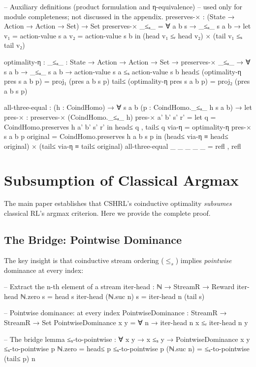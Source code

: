 \documentclass[9pt,a4paper]{article}
\theoremstyle{plain}
\theoremstyle{definition}
\theoremstyle{remark}
\begin{document}
\begin{code}[hide]
  -- Auxiliary definitions (product formulation and η-equivalence)
  -- used only for module completeness; not discussed in the appendix.
  preserves-× : (State → Action → Action → Set) → Set
  preserves-× _≤ₐ_ = ∀ a b s → _≤ₐ_ s a b →
                     let v₁ = action-value s a
                         v₂ = action-value s b
                     in (head v₁ ≤ᵣ head v₂) × (tail v₁ ≤ₛ tail v₂)

  optimality-η : {_≤ₐ_ : State → Action → Action → Set} →
                 preserves-× _≤ₐ_ →
                 ∀ s a b → _≤ₐ_ s a b →
                 action-value s a ≤ₛ action-value s b
  head≤ (optimality-η pres s a b p) = proj₁ (pres a b s p)
  tail≤ (optimality-η pres s a b p) = proj₂ (pres a b s p)

  all-three-equal : (h : CoindHomo) →
                    ∀ s a b (p : CoindHomo._≤ₐ_ h s a b) →
                    let pres-× : preserves-× (CoindHomo._≤ₐ_ h)
                        pres-× a' b' s' r' = let q = CoindHomo.preserves h a' b' s' r'
                                             in head≤ q , tail≤ q
                        via-η = optimality-η pres-× s a b p
                        original = CoindHomo.preserves h a b s p
                    in (head≤ via-η ≡ head≤ original)
                     × (tail≤ via-η ≡ tail≤ original)
  all-three-equal _ _ _ _ _ = refl , refl
\end{code}

\section{Subsumption of Classical Argmax}
\label{sec:subsumption}

The main paper establishes that CSHRL's coinductive optimality \emph{subsumes} classical RL's argmax criterion. Here we provide the complete proof.

\subsection{The Bridge: Pointwise Dominance}

The key insight is that coinductive stream ordering ($\le_s$) implies \emph{pointwise} dominance at every index:

\begin{code}
  -- Extract the n-th element of a stream
  iter-head : ℕ → StreamR → Reward
  iter-head ℕ.zero    s = head s
  iter-head (ℕ.suc n) s = iter-head n (tail s)

  -- Pointwise dominance: at every index
  PointwiseDominance : StreamR → StreamR → Set
  PointwiseDominance x y = ∀ n → iter-head n x ≤ᵣ iter-head n y

  -- The bridge lemma
  ≤ₛ-to-pointwise : ∀ {x y} → x ≤ₛ y → PointwiseDominance x y
  ≤ₛ-to-pointwise p ℕ.zero    = head≤ p
  ≤ₛ-to-pointwise p (ℕ.suc n) = ≤ₛ-to-pointwise (tail≤ p) n
\end{code}
\end{document}

